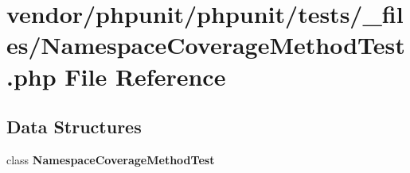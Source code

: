 \section{vendor/phpunit/phpunit/tests/\+\_\+files/\+Namespace\+Coverage\+Method\+Test.php File Reference}
\label{phpunit_2tests_2__files_2_namespace_coverage_method_test_8php}
\subsection*{Data Structures}
\begin{DoxyCompactItemize}
\item 
class {\bf Namespace\+Coverage\+Method\+Test}
\end{DoxyCompactItemize}
